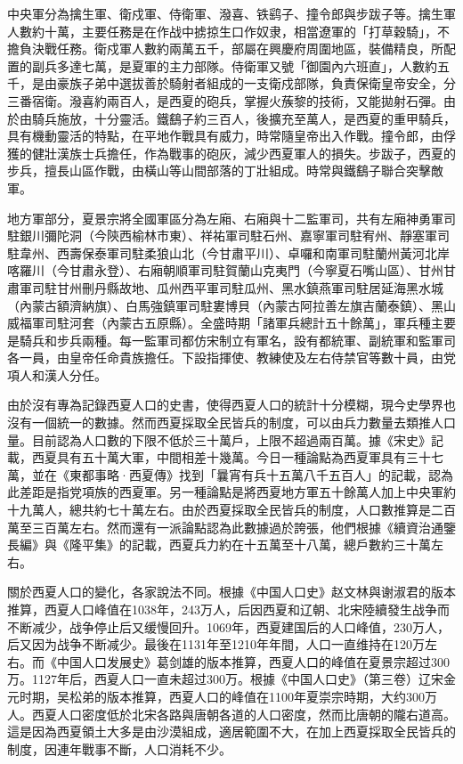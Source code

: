中央軍分為擒生軍、衛戍軍、侍衛軍、潑喜、铁鹞子、撞令郎與步跋子等。擒生軍人數約十萬，主要任務是在作战中掳掠生口作奴隶，相當遼軍的「打草穀騎」，不擔負決戰任務。衛戍軍人數約兩萬五千，部屬在興慶府周圍地區，裝備精良，所配置的副兵多達七萬，是夏軍的主力部隊。侍衛軍又號「御園內六班直」，人數約五千，是由豪族子弟中選拔善於騎射者組成的一支衛戍部隊，負責保衛皇帝安全，分三番宿衛。潑喜約兩百人，是西夏的砲兵，掌握火蔟黎的技術，又能拋射石彈。由於由騎兵施放，十分靈活。鐵鷂子約三百人，後擴充至萬人，是西夏的重甲騎兵，具有機動靈活的特點，在平地作戰具有威力，時常隨皇帝出入作戰。撞令郎，由俘獲的健壯漢族士兵擔任，作為戰事的砲灰，減少西夏軍人的損失。步跋子，西夏的步兵，擅長山區作戰，由橫山等山間部落的丁壯組成。時常與鐵鷂子聯合突擊敵軍。

地方軍部分，夏景宗將全國軍區分為左廂、右廂與十二監軍司，共有左廂神勇軍司駐銀川彌陀洞（今陝西榆林市東）、祥祐軍司駐石州、嘉寧軍司駐宥州、靜塞軍司駐韋州、西壽保泰軍司駐柔狼山北（今甘肅平川）、卓囉和南軍司駐蘭州黃河北岸喀羅川（今甘肅永登）、右廂朝順軍司駐賀蘭山克夷門（今寧夏石嘴山區）、甘州甘肅軍司駐甘州刪丹縣故地、瓜州西平軍司駐瓜州、黑水鎮燕軍司駐居延海黑水城（內蒙古額濟納旗）、白馬強鎮軍司駐婁博貝（內蒙古阿拉善左旗吉蘭泰鎮）、黑山威福軍司駐河套（內蒙古五原縣）。全盛時期「諸軍兵總計五十餘萬」，軍兵種主要是騎兵和步兵兩種。每一監軍司都仿宋制立有軍名，設有都統軍、副統軍和監軍司各一員，由皇帝任命貴族擔任。下設指揮使、教練使及左右侍禁官等數十員，由党項人和漢人分任。 

由於沒有專為記錄西夏人口的史書，使得西夏人口的統計十分模糊，現今史學界也沒有一個統一的數據。然而西夏採取全民皆兵的制度，可以由兵力數量去類推人口量。目前認為人口數的下限不低於三十萬戶，上限不超過兩百萬。據《宋史》記載，西夏具有五十萬大軍，中間相差十幾萬。今日一種論點為西夏軍具有三十七萬，並在《東都事略·西夏傳》找到「曩宵有兵十五萬八千五百人」的記載，認為此差距是指党項族的西夏軍。另一種論點是將西夏地方軍五十餘萬人加上中央軍約十九萬人，總共約七十萬左右。由於西夏採取全民皆兵的制度，人口數推算是二百萬至三百萬左右。然而還有一派論點認為此數據過於誇張，他們根據《續資治通鑒長編》與《隆平集》的記載，西夏兵力約在十五萬至十八萬，總戶數約三十萬左右。

關於西夏人口的變化，各家說法不同。根據《中国人口史》赵文林與谢淑君的版本推算，西夏人口峰值在1038年，243万人，后因西夏和辽朝、北宋陸續發生战争而不断减少，战争停止后又缓慢回升。1069年，西夏建国后的人口峰值，230万人，后又因为战争不断减少。最後在1131年至1210年年間，人口一直维持在120万左右。而《中国人口发展史》葛剑雄的版本推算，西夏人口的峰值在夏景宗超过300万。1127年后，西夏人口一直未超过300万。根據《中国人口史》（第三卷）辽宋金元时期，吴松弟的版本推算，西夏人口的峰值在1100年夏崇宗時期，大约300万人。西夏人口密度低於北宋各路與唐朝各道的人口密度，然而比唐朝的隴右道高。這是因為西夏領土大多是由沙漠組成，適居範圍不大，在加上西夏採取全民皆兵的制度，因連年戰事不斷，人口消耗不少。

